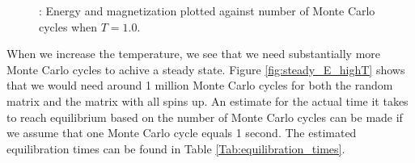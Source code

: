 \documentclass{article}
\begin{document}
{	\begin{figure}[H]
	\caption{: Energy and magnetization plotted against number of Monte Carlo cycles when $T = 1.0$.}
	\label{fig:steady_E}
	\end{figure}

	When we increase the temperature, we see that we need substantially more Monte Carlo cycles to achive a steady state. Figure \ref{fig:steady_E_highT} shows that we would need around 1 million Monte Carlo cycles for both the random matrix and the matrix with all spins up. An estimate for the actual time it takes to reach equilibrium based on the number of Monte Carlo cycles can be made if we assume that one Monte Carlo cycle equals 1 second. The estimated equilibration times can be found in Table \ref{Tab:equilibration_times}.

}
\end{document}
